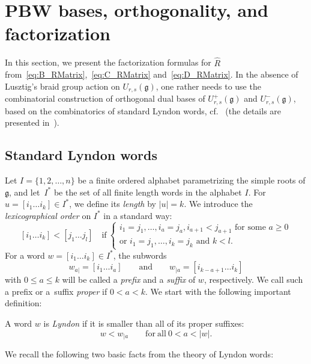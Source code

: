 \documentclass[10pt,a4paper]{amsart}
\numberwithin{equation}{section}
\newcommand{\fg}{\mathfrak{g}}
\newcommand{\uu}{U_{r,s}(\fg)}
\begin{document}
\section{PBW bases, orthogonality, and factorization}\label{sec:R-factorized}

In this section, we present the factorization formulas for $\hat{R}$ from~\eqref{eq:B_RMatrix},~\eqref{eq:C_RMatrix} and~\eqref{eq:D_RMatrix}. In the absence of Lusztig's braid group action on $\uu$, one rather needs to use the combinatorial construction of orthogonal dual bases of $U^+_{r,s}(\fg)$ and $U^-_{r,s}(\fg)$, based on the combinatorics of standard Lyndon words, cf.\ \cite{K1,K2,L,Ro} (the details are presented in~\cite{MT1,MT2}).

\subsection{Standard Lyndon words}\label{ssec:Lyndon}

Let $I=\{1, 2, \dots, n\}$ be a finite ordered alphabet parametrizing the simple roots of $\fg$, and let~$I^*$ be the set of all finite length words in the alphabet $I$. For $u=[i_1 \dots i_k]\in I^*$, we define its \emph{length} by $|u|=k$. We introduce the \emph{lexicographical order} on $I^*$ in a standard way:
\[
 [i_1 \dots i_k] < [j_1 \dots j_l]
\quad \text{if}\ \begin{cases}
\text{$i_1=j_1, \dots, i_a=j_a, i_{a+1} < j_{a+1}$ for some $a \geq 0$}\\
\text{or $i_1=j_1, \dots, i_k=j_k$ and $k < l$}.
\end{cases}
\]
For a word $w = [i_1 \dots i_k]\in I^*$, the subwords
\begin{displaymath}
 w_{a|} = [i_1 \dots i_a] \qquad \text{and} \qquad w_{|a} = [i_{k-a+1} \dots i_k]
\end{displaymath}
with $0\leq a\leq k$ will be called a \emph{prefix} and a \emph{suffix} of $w$, respectively.
We call such a prefix or a~suffix \emph{proper} if $0<a<k$. We start with the following important definition:

\begin{Definition}%
A word $w$ is \textit{Lyndon} if it is smaller than all of its proper suffixes:
\begin{displaymath}
 w < w_{|a} \qquad \mathrm{for\ all} \ 0<a<|w|.
\end{displaymath}
\end{Definition}

We recall the following two basic facts from the theory of Lyndon words:
\end{document}
